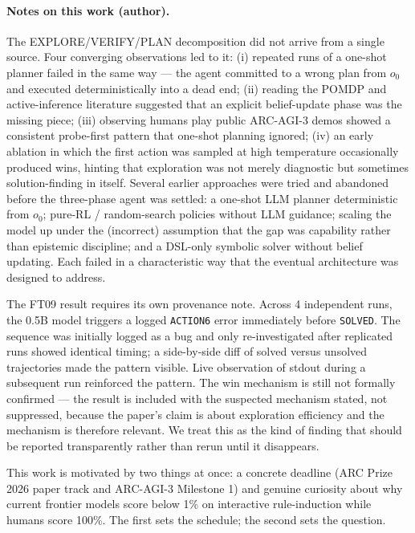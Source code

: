 \documentclass[11pt]{article}
\begin{document}
\paragraph{Notes on this work (author).} The EXPLORE/VERIFY/PLAN decomposition did not arrive from a single source. Four converging observations led to it: (i) repeated runs of a one-shot planner failed in the same way --- the agent committed to a wrong plan from $o_0$ and executed deterministically into a dead end; (ii) reading the POMDP and active-inference literature suggested that an explicit belief-update phase was the missing piece; (iii) observing humans play public ARC-AGI-3 demos showed a consistent probe-first pattern that one-shot planning ignored; (iv) an early ablation in which the first action was sampled at high temperature occasionally produced wins, hinting that exploration was not merely diagnostic but sometimes solution-finding in itself. Several earlier approaches were tried and abandoned before the three-phase agent was settled: a one-shot LLM planner deterministic from $o_0$; pure-RL / random-search policies without LLM guidance; scaling the model up under the (incorrect) assumption that the gap was capability rather than epistemic discipline; and a DSL-only symbolic solver without belief updating. Each failed in a characteristic way that the eventual architecture was designed to address.

The FT09 result requires its own provenance note. Across 4 independent runs, the 0.5B model triggers a logged \texttt{ACTION6} error immediately before \texttt{SOLVED}. The sequence was initially logged as a bug and only re-investigated after replicated runs showed identical timing; a side-by-side diff of solved versus unsolved trajectories made the pattern visible. Live observation of stdout during a subsequent run reinforced the pattern. The win mechanism is still not formally confirmed --- the result is included with the suspected mechanism stated, not suppressed, because the paper's claim is about exploration efficiency and the mechanism is therefore relevant. We treat this as the kind of finding that should be reported transparently rather than rerun until it disappears.

This work is motivated by two things at once: a concrete deadline (ARC Prize 2026 paper track and ARC-AGI-3 Milestone 1) and genuine curiosity about why current frontier models score below 1\% on interactive rule-induction while humans score 100\%. The first sets the schedule; the second sets the question.
\end{document}
